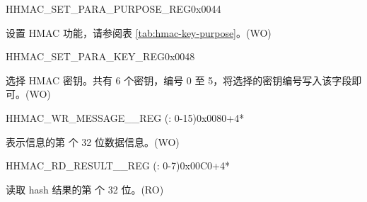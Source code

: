 \begin{register}{H}{HMAC\_SET\_PARA\_PURPOSE\_REG}{0x0044}\label{regdesc:HMACSETPARAPURPOSEREG}
%
%
\regnewline%
\begin{regdesc}\begin{reglist}
\label{fielddesc:HMACPURPOSESET}\item [HMAC\_PURPOSE\_SET] 设置 HMAC 功能，请参阅表 \ref{tab:hmac-key-purpose}。(WO)
\end{reglist}\end{regdesc}
\end{register}


\begin{register}{H}{HMAC\_SET\_PARA\_KEY\_REG}{0x0048}\label{regdesc:HMACSETPARAKEYREG}
%
%
\regnewline%
\begin{regdesc}\begin{reglist}
\label{fielddesc:HMACKEYSET}\item [HMAC\_KEY\_SET] 选择 HMAC 密钥。共有 6 个密钥，编号 0 至 5，将选择的密钥编号写入该字段即可。(WO)
\end{reglist}\end{regdesc}
\end{register}


\begin{register}{H}{HMAC\_WR\_MESSAGE\_\_REG (: 0-15)}{0x0080+4*}\label{regdesc:HMACWRMESSAGENREG}
%
\regnewline%
\begin{regdesc}\begin{reglist}
\label{fielddesc:HMACWDATAN}\item [HMAC\_WDATA\_\regindex{n}] 表示信息的第  个 32 位数据信息。(WO)
\end{reglist}\end{regdesc}
\end{register}


\begin{register}{H}{HMAC\_RD\_RESULT\_\_REG (: 0-7)}{0x00C0+4*}\label{regdesc:HMACRDRESULTNREG}
%
\regnewline%
\begin{regdesc}\begin{reglist}
\label{fielddesc:HMACRDATAN}\item [HMAC\_RDATA\_\regindex{n}] 读取 hash 结果的第  个 32 位。(RO)
\end{reglist}\end{regdesc}
\end{register}


